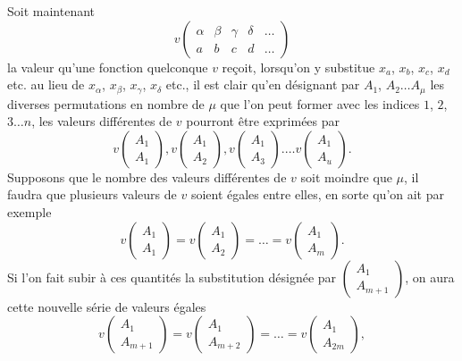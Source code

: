 \documentclass[oneside, 12 pt, leqno]{memoir}
\begin{document}
Soit maintenant
\[ v \left(\begin{array}{ccccc} \alpha & \beta & \gamma & \delta & \dots \\ a & b & c & d & \dots \end{array}\right)\]
la valeur qu'une fonction quelconque \(v\) reçoit, lorsqu'on y substitue \(x_a\), \(x_b\), \(x_c\), \(x_d\) etc. au lieu de \(x_\alpha\), \(x_\beta\), \(x_\gamma\), \(x_\delta\) etc., il est clair qu'en désignant par \(A_1\), \(A_2 \dots A_\mu\) les diverses permutations en nombre de \(\mu\) que l'on peut former avec les indices \(1\), \(2\), \(3 \dots n\), les valeurs différentes de \(v\) pourront être exprimées par
\[v\left(\begin{array}{l}A_1 \\A_1\end{array}\right),  v\left(\begin{array}{l}A_1 \\A_2\end{array}\right), v\left(\begin{array}{l}A_1 \\A_3\end{array}\right) .\dots v\left(\begin{array}{l}A_1 \\A_u\end{array}\right).\]
Supposons que le nombre des valeurs différentes de \(v\) soit moindre que \(\mu\), il faudra que plusieurs valeurs de \(v\) soient égales entre elles, en sorte qu'on ait par exemple
\[v\left(\begin{array}{l}A_1 \\A_1\end{array}\right)=v\left(\begin{array}{l}A_1 \\A_2\end{array}\right)=\dots=v\left(\begin{array}{l}A_1 \\A_m\end{array}\right).\]
Si l'on fait subir à ces quantités la substitution désignée par \(\left(\begin{array}{l}A_1 \\ A_{m+1}\end{array}\right)\), on aura cette nouvelle série de valeurs égales
\[v\left(\begin{array}{l}A_1 \\A_{m+1}\end{array}\right)=v\left(\begin{array}{l}A_1 \\A_{m+2}\end{array}\right)=\dots=v\left(\begin{array}{l}A_1 \\A_{2 m}\end{array}\right),\]
\end{document}

